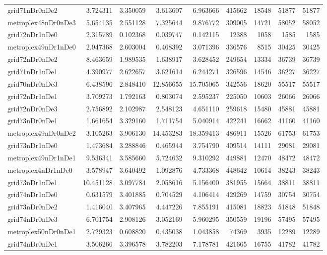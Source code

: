 \begin{longtable}{|l|r|r|r|r|r|r|r|r|}
grid71nDr0nDe2 & 3.724311 & 3.350059 & 3.613607 & 6.963666 & 415662 & 18548 & 51877 & 51877 \\
metroplex48nDr0nDe3 & 5.654135 & 2.551128 & 7.325644 & 9.876772 & 309005 & 14721 & 58052 & 58052 \\
grid72nDr1nDe0 & 2.315789 & 0.102368 & 0.039747 & 0.142115 & 12388 & 1058 & 1585 & 1585 \\
metroplex49nDr1nDe0 & 2.947368 & 2.603004 & 0.468392 & 3.071396 & 336576 & 8515 & 30425 & 30425 \\
grid72nDr0nDe2 & 8.463659 & 1.989535 & 1.638917 & 3.628452 & 249654 & 13334 & 36739 & 36739 \\
grid71nDr1nDe1 & 4.390977 & 2.622657 & 3.621614 & 6.244271 & 326596 & 14546 & 36227 & 36227 \\
grid70nDr0nDe3 & 6.438596 & 2.848410 & 12.856655 & 15.705065 & 342556 & 18620 & 55517 & 55517 \\
grid72nDr1nDe1 & 3.709273 & 1.792163 & 0.803074 & 2.595237 & 225050 & 10603 & 26066 & 26066 \\
grid72nDr0nDe3 & 2.756892 & 2.102987 & 2.548123 & 4.651110 & 259618 & 15480 & 45881 & 45881 \\
grid73nDr0nDe1 & 1.661654 & 3.329160 & 1.711754 & 5.040914 & 422241 & 16662 & 41160 & 41160 \\
metroplex49nDr0nDe2 & 3.105263 & 3.906130 & 14.453283 & 18.359413 & 486911 & 15526 & 61753 & 61753 \\
grid73nDr1nDe0 & 1.473684 & 3.288846 & 0.465944 & 3.754790 & 409514 & 14111 & 29081 & 29081 \\
metroplex49nDr1nDe1 & 9.536341 & 3.585660 & 5.724632 & 9.310292 & 449881 & 12470 & 48472 & 48472 \\
metroplex4nDr1nDe0 & 3.578947 & 3.640492 & 1.092876 & 4.733368 & 448642 & 10614 & 38243 & 38243 \\
grid73nDr1nDe1 & 10.451128 & 3.097784 & 2.058616 & 5.156400 & 381955 & 15664 & 38811 & 38811 \\
grid74nDr1nDe0 & 0.631579 & 3.401885 & 0.704529 & 4.106414 & 429269 & 14759 & 30754 & 30754 \\
grid73nDr0nDe2 & 1.416040 & 3.407965 & 4.447226 & 7.855191 & 415081 & 18823 & 51848 & 51848 \\
grid74nDr0nDe3 & 6.701754 & 2.908126 & 3.052169 & 5.960295 & 350559 & 19196 & 57495 & 57495 \\
metroplex50nDr0nDe1 & 2.729323 & 0.608820 & 0.435038 & 1.043858 & 74369 & 3935 & 12289 & 12289 \\
grid74nDr0nDe1 & 3.506266 & 3.396578 & 3.782203 & 7.178781 & 421665 & 16755 & 41782 & 41782 \\

\end{longtable}
